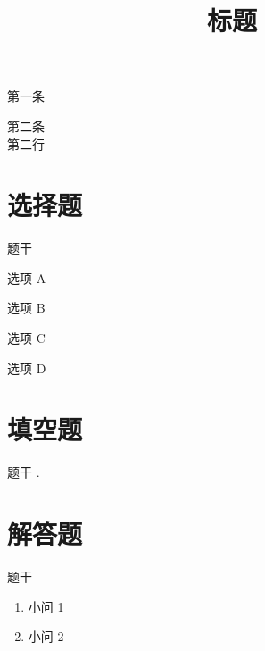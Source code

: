 \documentclass{./exam-zh}
\begin{document}
\title{标题}
\subject[3em]{科目}

\maketitle

\begin{notice}
    \item 第一条
    \item 第二条 \\ 第二行
\end{notice}

\section{选择题}

\begin{question}
题干

\begin{choices}
    \item 选项 A
    \item 选项 B
    \item 选项 C
    \item 选项 D
\end{choices}
\end{question}

\section{填空题}

\begin{question}
题干 \fillin[width=5em][].
\end{question}

\section{解答题}

\begin{question}[points=13]
题干

\begin{enumerate}
    \item 小问 1
    \item 小问 2
\end{enumerate}
\end{question}
\end{document}
